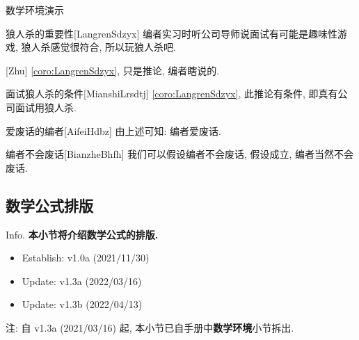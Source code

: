 \documentclass[hyperref, UTF8, CJK, aspectratio=169]{beamer}
\begin{document}
\begin{frame}{数学环境演示}
\begin{univcorollary}{狼人杀的重要性}[LangrenSdzyx]
		编者实习时听公司导师说面试有可能是趣味性游戏, 狼人杀感觉很符合, 所以玩狼人杀吧.
	\end{univcorollary}
	\begin{univremark}{}[Zhu]
		\vref{coro:LangrenSdzyx}, 只是推论, 编者瞎说的.
	\end{univremark}
	\begin{univcondition}{面试狼人杀的条件}[MianshiLrsdtj]
		\vref{coro:LangrenSdzyx}, 此推论有条件, 即真有公司面试用狼人杀.
	\end{univcondition}
	\begin{univconclusion}{爱废话的编者}[AifeiHdbz]
		由上述可知: 编者爱废话.
	\end{univconclusion}
	\begin{univassumption}{编者不会废话}[BianzheBhfh]
		我们可以假设编者不会废话, 假设成立, 编者当然不会废话.
	\end{univassumption}
\end{frame}

\subsection{数学公式排版}
\begin{frame}{Info.}
	\textbf{本小节将介绍数学公式的排版.}
	\begin{multicols}{2}
		\begin{itemize}
			\item Establish: \textcolor{univgreen}{v1.0a (2021/11/30)}
			\item Update: \textcolor{univgreen}{v1.3a (2022/03/16)}
      \item Update: \textcolor{univgreen}{v1.3b (2022/04/13)}
		\end{itemize}
	\end{multicols}
	注: 自 \textcolor{univgreen}{v1.3a (2021/03/16)} 起, 本小节已自手册中\alert{\textbf{数学环境}}小节拆出.\par
	\mycopyright
\end{frame}
\end{document}
